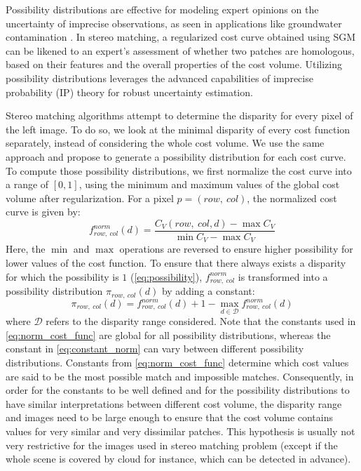 Possibility distributions are effective for modeling expert opinions on the uncertainty of imprecise observations, as seen in applications like groundwater contamination \cite{bardossy_l-_1995, baudrit_joint_2007}. In stereo matching, a regularized cost curve obtained using SGM can be likened to an expert's assessment of whether two patches are homologous, based on their features and the overall properties of the cost volume. Utilizing possibility distributions leverages the advanced capabilities of imprecise probability (IP) theory for robust uncertainty estimation.

Stereo matching algorithms attempt to determine the disparity for every pixel of the left image. To do so, we look at the minimal disparity of every cost function separately, instead of considering the whole cost volume. We use the same approach and propose to generate a possibility distribution for each cost curve. To compute those possibility distributions, we first normalize the cost curve into a range of \([0,1]\), using the minimum and maximum values of the global cost volume after regularization. For a pixel \( p = (row,~col) \), the normalized cost curve is given by:
\begin{equation}
    f_{row,~col}^{norm}(d) = \frac{C_V(row,~col,d) - \max C_V}{\min C_V - \max C_V} \label{eq:norm_cost_func}
\end{equation}
Here, the \(\min\) and \(\max\) operations are reversed to ensure higher possibility for lower values of the cost function. To ensure that there always exists a disparity for which the possibility is $1$ (\cref{eq:possibility}), \( f_{row,~col}^{norm} \) is transformed into a possibility distribution \( \pi_{row,~col}(d) \) by adding a constant:
\begin{equation}
    \pi_{row,~col}(d) = f_{row,~col}^{norm}(d) + 1 - \max_{d \in \mathcal{D}} f_{row,~col}^{norm}(d) \label{eq:constant_norm}
\end{equation}
where \(\mathcal{D}\) refers to the disparity range considered. Note that the constants used in \ref{eq:norm_cost_func} are global for all possibility distributions, whereas the constant in \cref{eq:constant_norm} can vary between different possibility distributions. Constants from \cref{eq:norm_cost_func} determine which cost values are said to be the most possible match and impossible matches. Consequently, in order for the constants to be well defined and for the possibility distributions to have similar interpretations between different cost volume, the disparity range and images need to be large enough to ensure that the cost volume contains values for very similar and very dissimilar patches. This hypothesis is usually not very restrictive for the images used in stereo matching problem (except if the whole scene is covered by cloud for instance, which can be detected in advance).

